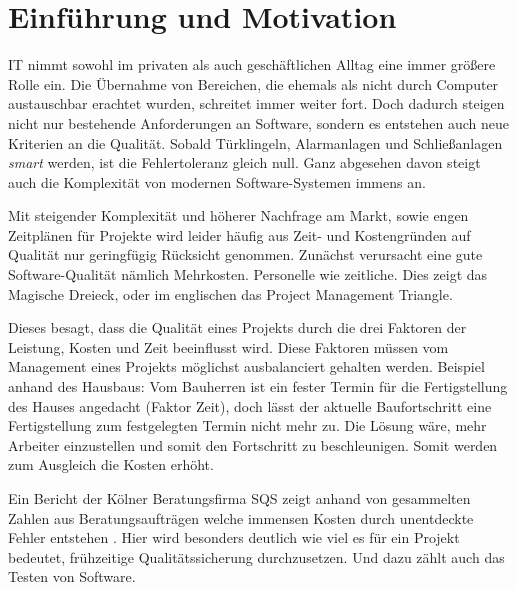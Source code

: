 \documentclass[12pt,a4paper,bibliography=totocnumbered,listof=totocnumbered]{scrartcl}
\begin{document}
\onehalfspacing
\renewcommand{\thesection}{\arabic{section}}
\renewcommand{\theHsection}{\arabic{section}}
\setcounter{section}{0}
\setcounter{page}{1}
\setcounter{secnumdepth}{6}

\section{Einführung und Motivation}

IT nimmt sowohl im privaten als auch geschäftlichen Alltag eine immer größere Rolle ein. Die Übernahme von Bereichen, die ehemals als nicht durch Computer austauschbar erachtet wurden, schreitet immer weiter fort. Doch dadurch steigen nicht nur bestehende Anforderungen an Software, sondern es entstehen auch neue Kriterien an die Qualität. Sobald Türklingeln, Alarmanlagen und Schließanlagen \textit{smart} werden, ist die Fehlertoleranz gleich null. Ganz abgesehen davon steigt auch die Komplexität von modernen Software-Systemen immens an.

Mit steigender Komplexität und höherer Nachfrage am Markt, sowie engen Zeitplänen für Projekte wird leider häufig aus Zeit- und Kostengründen auf Qualität nur geringfügig Rücksicht genommen. Zunächst verursacht eine gute Software-Qualität nämlich Mehrkosten. Personelle wie zeitliche. Dies zeigt das Magische Dreieck, oder im englischen das Project Management Triangle.


Dieses besagt, dass die Qualität eines Projekts durch die drei Faktoren der Leistung, Kosten und Zeit beeinflusst wird. Diese Faktoren müssen vom Management eines Projekts möglichst ausbalanciert gehalten werden. Beispiel anhand des Hausbaus: Vom Bauherren ist ein fester Termin für die Fertigstellung des Hauses angedacht (Faktor Zeit), doch lässt der aktuelle Baufortschritt eine Fertigstellung zum festgelegten Termin nicht mehr zu. Die Lösung wäre, mehr Arbeiter einzustellen und somit den Fortschritt zu beschleunigen. Somit werden zum Ausgleich die Kosten erhöht.

Ein Bericht der Kölner Beratungsfirma SQS zeigt anhand von gesammelten Zahlen aus Beratungsaufträgen welche immensen Kosten durch unentdeckte Fehler entstehen \cite{sqsdefect}. Hier wird besonders deutlich wie viel es für ein Projekt bedeutet, frühzeitige Qualitätssicherung durchzusetzen. Und dazu zählt auch das Testen von Software.
\end{document}

